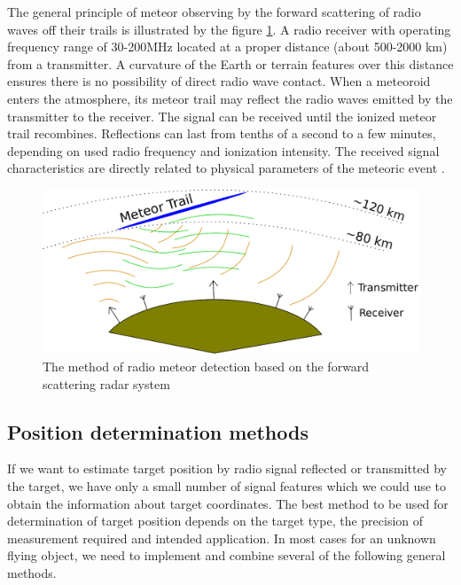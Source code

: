 \documentclass[twoside]{ctuthesis}
\theoremstyle{plain}
\theoremstyle{definition}
\theoremstyle{note}
\begin{document}
The general principle of meteor observing by the forward scattering of radio waves off their trails is illustrated by the figure \ref{fig:forward_scattering}. A radio receiver with operating frequency range of 30-200MHz located at a proper distance (about 500-2000 km) from a transmitter. A curvature of the Earth or terrain features over this distance ensures there is no possibility of direct radio wave contact. When a meteoroid enters the atmosphere, its meteor trail may reflect the radio waves emitted by the transmitter to the receiver. The signal can be received until the ionized meteor trail recombines. Reflections can last from tenths of a second to a few minutes, depending on used radio frequency and ionization intensity. The received signal characteristics are directly related to physical parameters of the meteoric event \cite{forward_scatter}.

\begin{figure}
 \begin{center}
 \includegraphics[width=\linewidth]{./img/Meteor_detection.pdf}
 \caption{The method of radio meteor detection based on the forward scattering radar system}
  \label{fig:forward_scattering} 
 \end{center}
\end{figure}

\subsection{Position determination methods}

If we want to estimate target position by radio signal reflected or transmitted by the target, we have only a small number of signal features which we could use to obtain the information about target coordinates. The best method to be used for determination of target position depends on the target type, the precision of measurement required and intended application. In most cases for an unknown flying object, we need to implement and combine several of the following general methods. 
\end{document}
